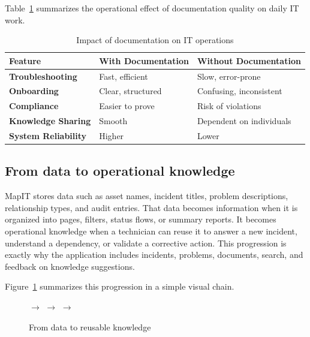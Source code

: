 Table~\ref{tab:it-doc-impact} summarizes the operational effect of documentation quality on daily IT work.

\begin{table}[H]
\centering
\small
\renewcommand{\arraystretch}{1.15}
\begin{tabular}{|p{}|p{}|p{}|}
\hline
\textbf{Feature} & \textbf{With Documentation} & \textbf{Without Documentation} \\ \hline
\textbf{Troubleshooting} & Fast, efficient & Slow, error-prone \\ \hline
\textbf{Onboarding} & Clear, structured & Confusing, inconsistent \\ \hline
\textbf{Compliance} & Easier to prove & Risk of violations \\ \hline
\textbf{Knowledge Sharing} & Smooth & Dependent on individuals \\ \hline
\textbf{System Reliability} & Higher & Lower \\ \hline
\end{tabular}
\caption{Impact of documentation on IT operations}
\label{tab:it-doc-impact}
\end{table}

\subsection{From data to operational knowledge}
MapIT stores data such as asset names, incident titles, problem descriptions, relationship types, and audit entries. That data becomes information when it is organized into pages, filters, status flows, or summary reports. It becomes operational knowledge when a technician can reuse it to answer a new incident, understand a dependency, or validate a corrective action. This progression is exactly why the application includes incidents, problems, documents, search, and feedback on knowledge suggestions.

Figure~\ref{fig:data-to-knowledge-chain} summarizes this progression in a simple visual chain.

\begin{figure}[H]
\centering
{}
\hspace{0.25cm}$\rightarrow$\hspace{0.25cm}
\hspace{0.25cm}$\rightarrow$\hspace{0.25cm}
\hspace{0.25cm}$\rightarrow$\hspace{0.25cm}
\caption{From data to reusable knowledge}
\label{fig:data-to-knowledge-chain}
\end{figure}

